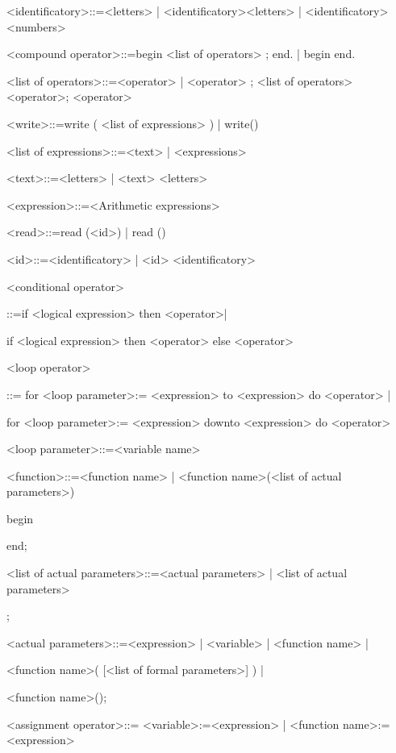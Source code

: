 \documentclass[12pt]{article}
\begin{document}
<identificatory>::=<letters>  | <identificatory><letters> | <identificatory><numbers>

<compound operator>::=begin <list of operators> ; end. | begin end.

<list of operators>::=<operator>  | <operator> ; <list of operators>  <operator>;
<operator>

<write>::=write ( <list of expressions> )  | write()

<list of expressions>::=<text> | <expressions>

<text>::=<letters>  | <text>   <letters>

<expression>::=<Arithmetic expressions>

<read>::=read (<id>)  | read ()

<id>::=<identificatory> | <id> <identificatory>

<conditional operator> 

\qquad\qquad\qquad\qquad\qquad ::=if <logical expression> then <operator>|

\qquad\qquad\qquad\qquad\qquad if <logical expression> then <operator> else <operator>

<loop operator> 

\qquad::= for <loop parameter>:= <expression> to <expression> do <operator>  | 

\qquad      for <loop parameter>:= <expression> downto <expression> do <operator>

<loop parameter>::=<variable name>


<function>::=<function name> | <function name>(<list of actual parameters>)

\qquad    begin

 \qquad{}

 \qquad   end;

<list of actual parameters>::=<actual parameters>  | <list of actual parameters>

\qquad\qquad\qquad\qquad\qquad\qquad\qquad\qquad{};

<actual parameters>::=<expression>  | <variable>  | <function name>  |  

\qquad\qquad\qquad\qquad\qquad\qquad\qquad\qquad{}


<function name>( [<list of formal parameters>] )  | 

<function name>();


<assignment operator>::= <variable>:=<expression> | <function name>:=<expression> 
\end{document}
